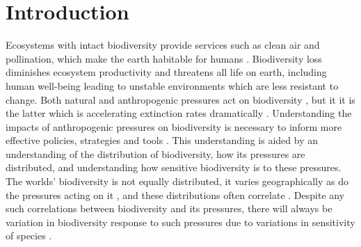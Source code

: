 \documentclass[11pt, a4paper, titlepage]{article}
\begin{document}
\newpage
\tableofcontents
\newpage
	
    \section*{Introduction}
    	
Ecosystems with intact biodiversity provide services such as clean air and pollination, which make the earth habitable for humans \citep{leemans2003millennium}. Biodiversity loss diminishes ecosystem productivity \citep{duffy2017biodiversity} and threatens all life on earth, including human well-being \citep{diaz2006biodiversity} leading to unstable environments which are less resistant to change. Both natural and anthropogenic pressures act on biodiversity \citep{nobel2020anthropogenic}, but it it is the latter which is accelerating extinction rates dramatically \citep{ceballos2015accelerated}. Understanding the impacts of anthropogenic pressures on biodiversity is necessary to inform more effective policies, strategies and tools \citep{diaz2006biodiversity}. This understanding is aided by an understanding of the  distribution of biodiversity, how its pressures are distributed, and understanding how sensitive biodiversity is to these pressures. The worlds' biodiversity is not equally distributed, it varies geographically \citep{gaston2000global, ricklefs2004comprehensive, mcrae2017diversity}  as do the pressures acting on it \citep{millennium2005ecosystems, sala2000global, bowler2020mapping}, and these distributions often correlate \citep{ament2019compatibility, Velde2022}. Despite any such correlations between biodiversity and its pressures, there will always be variation in biodiversity response to such pressures due to variations in sensitivity of species \citep{bowler2020mapping}. \newline
\end{document}

